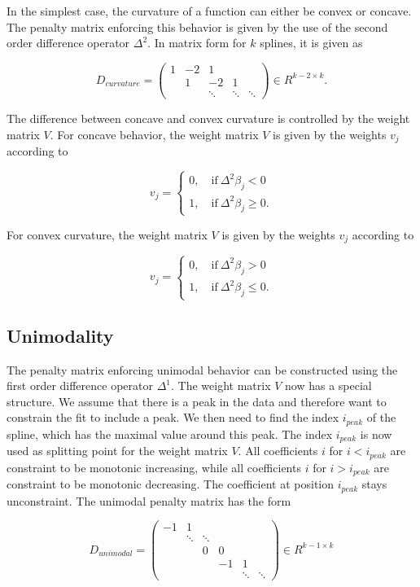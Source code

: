 \documentclass[10pt,a4paper]{article}
\begin{document}
	In the simplest case, the curvature of a function can either be convex or concave. The penalty matrix  enforcing this behavior is given by the use of the second order difference operator $\Delta^2$. In matrix form for $k$ splines, it is given as
	
	$$D_{curvature} = \begin{pmatrix} 1 & -2 & 1 \\ & 1 &-2 &1 \\ & & \ddots & \ddots & \ddots  \end{pmatrix} \in R^{k-2 \times k}.$$
	
	The difference between concave and convex curvature is controlled by the weight matrix $V$. For concave behavior, the weight matrix $V$ is given by the weights $v_j$ according to
	
	$$v_j = \begin{cases} 0, \quad \text{if} \ \Delta^2\beta_j < 0 \\ 1, \quad \text{if} \ \Delta^2\beta_j \ge 0. \end{cases}$$
	
	For convex curvature, the weight matrix $V$ is given by the weights $v_j$ according to
	
	$$v_j = \begin{cases} 0, \quad \text{if} \ \Delta^2\beta_j > 0 \\ 1, \quad \text{if} \ \Delta^2\beta_j \le 0. \end{cases}$$
	
	\subsection{Unimodality}
	
	The penalty matrix enforcing unimodal behavior can be constructed using the first order difference operator $\Delta^1$. The weight matrix $V$ now has a special structure. We assume that there is a peak in the data and therefore want to constrain the fit to include a peak. We then need to find the index $i_{peak}$ of the spline, which has the maximal value around this  peak. The index $i_{peak}$ is now used as splitting point for the weight matrix $V$. All coefficients $i$ for $i < i_{peak}$ are constraint to be monotonic increasing, while all coefficients $i$ for $i > i_{peak}$ are constraint to be monotonic decreasing. The coefficient at position $i_{peak}$ stays unconstraint.  The unimodal penalty matrix has the form 
	
	$$D_{unimodal} = \begin{pmatrix} -1 & 1 \\ 
									    & \ddots & \ddots  \\
									    & & 0 & 0 \\ 
									    & & & -1 & 1 \\
									    & & & &  \ddots & \ddots 
					 \end{pmatrix} \in R^{k-1 \times k}$$
	
\end{document}
